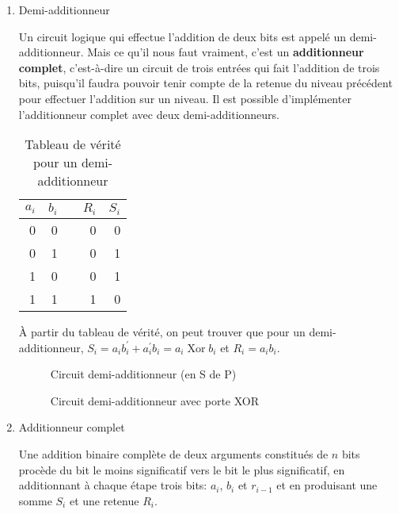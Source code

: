 \documentclass[letter, oneside]{book}
\begin{document}
\begin{enumerate}
\item Demi-additionneur
\label{sec:org583a956}

Un circuit logique qui effectue l'addition de deux bits est appelé un
demi-additionneur. Mais ce qu'il nous faut vraiment, c'est un
\textbf{additionneur complet}, c'est-à-dire un circuit de trois entrées qui
fait l'addition de trois bits, puisqu'il faudra pouvoir tenir compte
de la retenue du niveau précédent pour effectuer l'addition sur un
niveau. Il est possible d'implémenter l'additionneur complet avec deux
demi-additionneurs.

\begin{table}[htbp]
\caption{\label{tab:org8b2afa0}Tableau de vérité pour un demi-additionneur}
\centering
\begin{tabular}{rrlrr}
\(a_{i}\) & \(b_{i}\) &  & \(R_{i}\) & \(S_{i}\)\\[0pt]
\hline
0 & 0 &  & 0 & 0\\[0pt]
0 & 1 &  & 0 & 1\\[0pt]
1 & 0 &  & 0 & 1\\[0pt]
1 & 1 &  & 1 & 0\\[0pt]
\end{tabular}
\end{table}


À partir du tableau de vérité, on peut trouver que pour un
demi-additionneur, \(S_{i} = a_i b_i^\prime + a_i^\prime b_i = a_i
\operatorname{Xor} b_i\) et \(R_{i} = a_i b_i\).

\begin{figure}[htbp]
\centering

\caption{\label{fig:orgc359188}Circuit demi-additionneur (en S de P)}
\end{figure}


\begin{figure}[htbp]
\centering

\caption{\label{fig:org665957b}Circuit demi-additionneur avec porte XOR}
\end{figure}

\item Additionneur complet
\label{sec:org4f93230}

Une addition binaire complète de deux arguments constitués de \(n\)
bits procède du bit le moins significatif vers le bit le plus
significatif, en additionnant à chaque étape trois bits: \(a_{i}\),
\(b_{i}\) et \(r_{i-1}\) et en produisant une somme \(S_{i}\) et une
retenue \(R_{i}\).



\end{enumerate}
\end{document}

